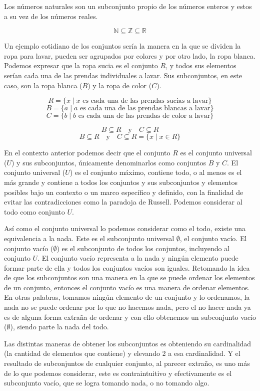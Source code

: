 \documentclass[letterpaper,13pt]{article}
\begin{document}
Los números naturales son un subconjunto propio de los números enteros y estos a su vez de los números reales.

\[
\mathbb{N} \subseteq \mathbb{Z} \subseteq \mathbb{R}
\]

Un ejemplo cotidiano de los conjuntos sería la manera en la que se dividen la ropa para lavar, pueden ser agrupados por colores y por otro lado, la ropa blanca. Podemos expresar que la ropa sucia es el conjunto \( R \), y todos sus elementos serían cada una de las prendas individuales a lavar. Sus subconjuntos, en este caso, son la ropa blanca (\( B \)) y la ropa de color (\( C \)).

\[
R = \{ x \mid x \text{ es cada una de las prendas sucias a lavar} \}
\]
\[
B = \{ a \mid a \text{ es cada una de las prendas blancas a lavar} \}
\]
\[
C = \{ b \mid b \text{ es cada una de las prendas de color a lavar} \}
\]

\[
B \subseteq R \quad \text{y} \quad C \subseteq R
\]
\[
B \subseteq R \quad \text{y} \quad C \subseteq R = \{ x \mid x \in R \}
\]

En el contexto anterior podemos decir que el conjunto \( R \) es el conjunto universal (\( U \)) y sus subconjuntos, únicamente denominarlos como conjuntos \( B \) y \( C \). El conjunto universal (\( U \)) es el conjunto máximo, contiene todo, o al menos es el más grande y contiene a todos los conjuntos y sus subconjuntos y elementos posibles bajo un contexto o un marco específico y definido, con la finalidad de evitar las contradicciones como la paradoja de Russell. Podemos considerar al todo como conjunto \( U \).

Así como el conjunto universal lo podemos considerar como el todo, existe una equivalencia a la nada. Este es el subconjunto universal \( \emptyset \), el conjunto vacío. El conjunto vacío (\( \emptyset \)) es el subconjunto de todos los conjuntos, incluyendo al conjunto \( U \). El conjunto vacío representa a la nada y ningún elemento puede formar parte de ella y todos los conjuntos vacíos son iguales. Retomando la idea de que los subconjuntos son una manera en la que se puede ordenar los elementos de un conjunto, entonces el conjunto vacío es una manera de ordenar elementos. En otras palabras, tomamos ningún elemento de un conjunto y lo ordenamos, la nada no se puede ordenar por lo que no hacemos nada, pero el no hacer nada ya es de alguna forma extraña de ordenar y con ello obtenemos un subconjunto vacío (\( \emptyset \)), siendo parte la nada del todo.

Las distintas maneras de obtener los subconjuntos es obteniendo su cardinalidad (la cantidad de elementos que contiene) y elevando 2 a esa cardinalidad. Y el resultado de subconjuntos de cualquier conjunto, al parecer extraño, es uno más de lo que podemos considerar, este es contraintuitivo y efectivamente es el subconjunto vacío, que se logra tomando nada, o no tomando algo.
\end{document}
